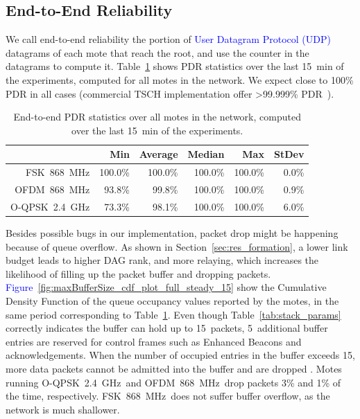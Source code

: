 \documentclass[sensors,article,submit,moreauthors,pdftex]{Definitions/mdpi}
\newcommand{\fsk}           {FSK~868~MHz}
\newcommand{\oqpsk}         {O-QPSK~2.4~GHz}
\newcommand{\ofdm}          {OFDM~868~MHz}
\newcommand{\update}[1]     {\textcolor{blue}{#1}}
\begin{document}
\subsection{End-to-End Reliability}
\label{sec:res_reliability}


We call end-to-end reliability the portion of \update {User Datagram Protocol (UDP)} datagrams of each mote that reach the root, and use the counter in the datagrams to compute it.
Table~\ref{tab:pdr_table} shows PDR statistics over the last 15~min of the experiments, computed for all motes in the network.
We expect close to 100\% PDR in all cases (commercial TSCH implementation offer >99.999\% PDR~\cite{vucinic20key}).

\begin{table}[ht]
    \centering
    \caption{End-to-end PDR statistics over all motes in the network, computed over the last 15~min of the experiments.}
    \begin{tabular}{|r|r|r|r|r|r|}
        \hline
                &      Min &  Average &   Median &      Max &  StDev \\ \hline
        \fsk    &  100.0\% &  100.0\% &  100.0\% &  100.0\% &  0.0\% \\ \hline
        \ofdm   &   93.8\% &   99.8\% &  100.0\% &  100.0\% &  0.9\% \\ \hline
        \oqpsk  &   73.3\% &   98.1\% &  100.0\% &  100.0\% &  6.0\% \\ \hline
    \end{tabular}

    \label{tab:pdr_table}
\end{table}


Besides possible bugs in our implementation, packet drop might be happening because of queue overflow.
As shown in Section~\ref{sec:res_formation}, a lower link budget leads to higher DAG rank, and more relaying, which increases the likelihood of filling up the packet buffer and dropping packets.
\update{Figure}~\ref{fig:maxBufferSize_cdf_plot_full_steady_15} show the Cumulative Density Function of the queue occupancy values reported by the motes, in the same period corresponding to Table~\ref{tab:pdr_table}.
Even though Table~\ref{tab:stack_params} correctly indicates the buffer can hold up to 15~packets, 5~additional buffer entries are reserved for control frames such as Enhanced Beacons and acknowledgements.
When the number of occupied entries in the buffer exceeds 15, more data packets cannot be admitted into the buffer and are dropped .
Motes running \oqpsk\ and \ofdm\ drop packets 3\% and 1\% of the time, respectively.
\fsk\ does not suffer buffer overflow, as the network is much shallower.
\end{document}
